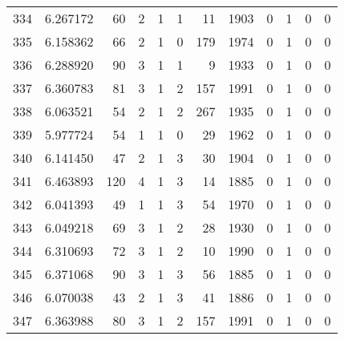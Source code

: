 \begin{tabular}{lrrrrrrrrrrr}
334 &  6.267172 &   60 &      2 &        1 &      1 &              11 &  1903 &               0 &               1 &               0 &               0 \\
335 &  6.158362 &   66 &      2 &        1 &      0 &             179 &  1974 &               0 &               1 &               0 &               0 \\
336 &  6.288920 &   90 &      3 &        1 &      1 &               9 &  1933 &               0 &               1 &               0 &               0 \\
337 &  6.360783 &   81 &      3 &        1 &      2 &             157 &  1991 &               0 &               1 &               0 &               0 \\
338 &  6.063521 &   54 &      2 &        1 &      2 &             267 &  1935 &               0 &               1 &               0 &               0 \\
339 &  5.977724 &   54 &      1 &        1 &      0 &              29 &  1962 &               0 &               1 &               0 &               0 \\
340 &  6.141450 &   47 &      2 &        1 &      3 &              30 &  1904 &               0 &               1 &               0 &               0 \\
341 &  6.463893 &  120 &      4 &        1 &      3 &              14 &  1885 &               0 &               1 &               0 &               0 \\
342 &  6.041393 &   49 &      1 &        1 &      3 &              54 &  1970 &               0 &               1 &               0 &               0 \\
343 &  6.049218 &   69 &      3 &        1 &      2 &              28 &  1930 &               0 &               1 &               0 &               0 \\
344 &  6.310693 &   72 &      3 &        1 &      2 &              10 &  1990 &               0 &               1 &               0 &               0 \\
345 &  6.371068 &   90 &      3 &        1 &      3 &              56 &  1885 &               0 &               1 &               0 &               0 \\
346 &  6.070038 &   43 &      2 &        1 &      3 &              41 &  1886 &               0 &               1 &               0 &               0 \\
347 &  6.363988 &   80 &      3 &        1 &      2 &             157 &  1991 &               0 &               1 &               0 &               0 \\

\end{tabular}
